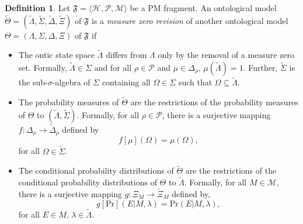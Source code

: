 \documentclass[DIV=calc,fontsize=12pt]{scrartcl} %
\theoremstyle{definition}
\newtheorem{definition}{Definition}[section]
\theoremstyle{plain}
\newcommand{\Hilb}[1][]{\ensuremath{\mathcal{H}_{#1}}}
\begin{document}
\begin{definition}
Let $\mathfrak{F} = \langle \Hilb, \mathcal{P}, \mathcal{M} \rangle$
be a PM fragment.  An ontological model $\tilde{\Theta} =
(\tilde{\Lambda}, \tilde{\Sigma}, \tilde{\Delta}, \tilde{\Xi})$ of
$\mathfrak{F}$ is a \emph{measure zero revision} of another
ontological model $\Theta = (\Lambda, \Sigma, \Delta, \Xi)$ of
$\mathfrak{F}$ if
\begin{itemize}
\item The ontic state space $\tilde{\Lambda}$ differs from $\Lambda$
only by the removal of a measure zero set.  Formally,
$\tilde{\Lambda} \in \Sigma$ and for all $\rho \in \mathcal{P}$
and $\mu \in \Delta_{\rho}$, $\mu(\tilde{\Lambda}) = 1$.  Further,
$\tilde{\Sigma}$ is the sub-$\sigma$-algebra of $\Sigma$
containing all $\Omega \in \Sigma$ such that $\Omega \subseteq
\tilde{\Lambda}$.
\item The probability measures of $\tilde{\Theta}$ are the restrictions
of the probability measures of $\Theta$ to $(\tilde{\Lambda},
\tilde{\Sigma})$.  Formally, for all $\rho \in \mathcal{P}$, there
is a surjective mapping $f:\Delta_{\rho} \rightarrow
\tilde{\Delta}_{\rho}$ defined by
\begin{equation}
f[\mu](\Omega) = \mu(\Omega),
\end{equation}
for all $\Omega \in \tilde{\Sigma}$.
\item The conditional probability distributions of $\tilde{\Theta}$
are the restrictions of the conditional probability distributions
of $\Theta$ to $\tilde{\Lambda}$.  Formally, for all $M \in
\mathcal{M}$, there is a surjective mapping $g:\Xi_M \rightarrow
\tilde{\Xi}_M$ defined by,
\begin{equation}
g[\text{Pr}](E|M,\lambda) = \text{Pr}(E|M,\lambda),
\end{equation}
for all $E \in M$, $\lambda \in \tilde{\Lambda}$.
\end{itemize}
\end{definition}
\end{document}
